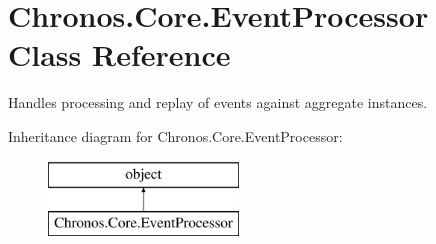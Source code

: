 \hypertarget{classChronos_1_1Core_1_1EventProcessor}{}\section{Chronos.\+Core.\+Event\+Processor Class Reference}
\label{classChronos_1_1Core_1_1EventProcessor}


Handles processing and replay of events against aggregate instances.  


Inheritance diagram for Chronos.\+Core.\+Event\+Processor\+:\begin{figure}[H]
\begin{center}
\leavevmode
\includegraphics[height=2.000000cm]{classChronos_1_1Core_1_1EventProcessor}
\end{center}
\end{figure}
